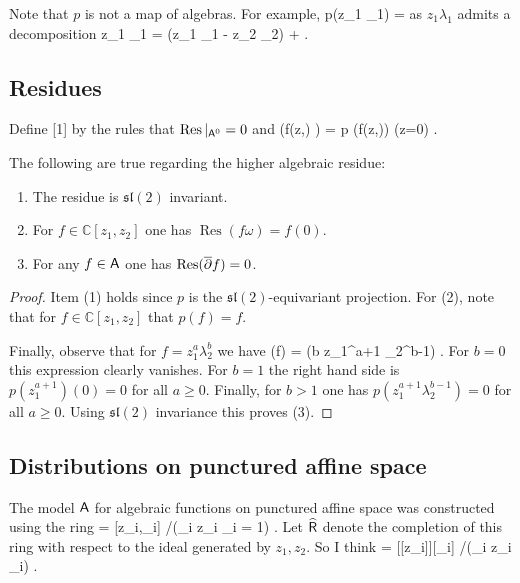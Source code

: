 \documentclass[11pt]{amsart}
\def\C{{\mathbb{C}}}
\renewcommand{\op}{\operatorname}
\def\lie#1{\ensuremath{\mathfrak{#1}}}
\begin{document}
Note that $p$ is not a map of algebras. 
For example,
\beqn
p(z_1 \lambda_1) = 
\eeqn
as $z_1 \lambda_1$ admits a decomposition
\beqn
z_1 \lambda_1 =  (z_1 \lambda_1 - z_2 \lambda_2) +  .
\eeqn

\subsection{Residues}

Define
\beqn
\op{Res} \colon \sfA \to \C[1]
\eeqn
by the rules that $\op{Res}|_{\sfA^0} = 0$ and
\beqn
\op{Res} \left(f(z,\lambda) \omega \right) = p (f(z,\lambda)) (z=0) .
\eeqn

\begin{lem} The following are true regarding the higher algebraic residue:
\begin{enumerate}
\item The residue is $\lie{sl}(2)$ invariant.
\item For $f \in \C[z_1,z_2]$ one has $\op{Res}(f \omega) = f(0)$.
\item For any $f \in \mathsf A$ one has $\op{Res}(\dbar f) = 0$.
\end{enumerate}
\end{lem}
\begin{proof}
Item (1) holds since $p$ is the $\lie{sl}(2)$-equivariant projection. 
For (2), note that for $f \in \C[z_1,z_2]$ that $p(f) = f$.

Finally, observe that for $f = z_1^a \lambda_2^b$ we have
\beqn
\op{Res}(\dbar f) = \op{Res}(b z_1^{a+1} \lambda_2^{b-1}) .
\eeqn
For $b =0$ this expression clearly vanishes. 
For $b = 1$ the right hand side is $p( z_1^{a+1})(0) = 0$ for all $a \geq 0$.
Finally, for $b > 1$ one has $p(z_1^{a+1} \lambda_2^{b-1}) = 0$ for all $a \geq 0$.
Using $\lie{sl}(2)$ invariance this proves (3).
\end{proof}

\subsection{Distributions on punctured affine space}

The model $\mathsf A$ for algebraic functions on punctured affine space was constructed using the ring
\beqn
\sfR = \C[z_i,\lambda_i] \slash (\sum_i z_i \lambda_i = 1) .
\eeqn
Let $\widehat{\mathsf R}$ denote the completion of this ring with respect to the ideal generated by $z_1,z_2$.
So I think
\beqn
\Hat{\sfR} = \C[[z_i]][\lambda_i] \slash (\sum_i z_i \lambda_i) .
\eeqn
\end{document}
